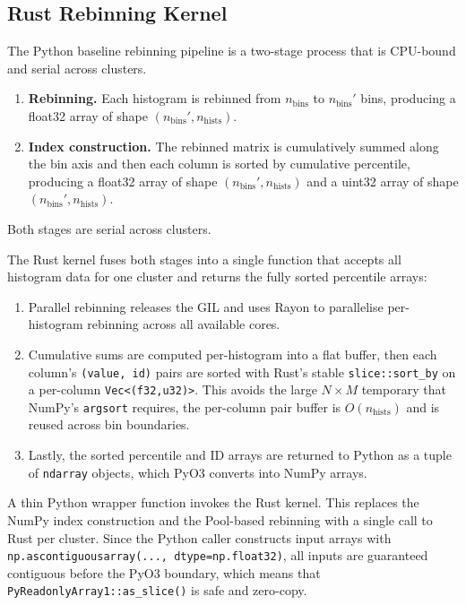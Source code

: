 \subsection{Rust Rebinning Kernel\label{sec:method:impl:rebinning}}

The Python baseline rebinning pipeline is a two-stage process that is CPU-bound and serial across clusters.
\begin{enumerate}
    \item \textbf{Rebinning.} Each histogram is rebinned from $n_\text{bins}$ to $n_\text{bins}'$ bins, producing a float32 array of shape $(n_\text{bins}', n_\text{hists})$. 
    \item \textbf{Index construction.} The rebinned matrix is cumulatively summed along the bin axis and then each column is sorted by cumulative percentile, producing a float32 array of shape $(n_\text{bins}', n_\text{hists})$ and a uint32 array of shape $(n_\text{bins}', n_\text{hists})$.
\end{enumerate}

Both stages are serial across clusters.

The Rust kernel fuses both stages into a single function that accepts all histogram data for one cluster and returns the fully sorted percentile arrays:

\begin{enumerate}
    \item Parallel rebinning releases the GIL and uses Rayon to parallelise per-histogram rebinning across all available cores.
    \item Cumulative sums are computed per-histogram into a flat buffer, then each column's \texttt{(value,\,id)} pairs are sorted with Rust's stable \texttt{slice::sort\_by} on a per-column \texttt{Vec<(f32,u32)>}. This avoids the large $N \times M$ temporary that NumPy's \texttt{argsort} requires, the per-column pair buffer is $O(n_\text{hists})$ and is reused across bin boundaries.
    \item Lastly, the sorted percentile and ID arrays are returned to Python as a tuple of \texttt{ndarray} objects, which PyO3 converts into NumPy arrays.
\end{enumerate}

A thin Python wrapper function invokes the Rust kernel. This replaces the NumPy index construction and the Pool-based rebinning with a single call to Rust per cluster. Since the Python caller constructs input arrays with \texttt{np.ascontiguousarray(..., dtype=np.float32)}, all inputs are guaranteed contiguous before the PyO3 boundary, which means that \texttt{PyReadonlyArray1::as\_slice()} is safe and zero-copy.

